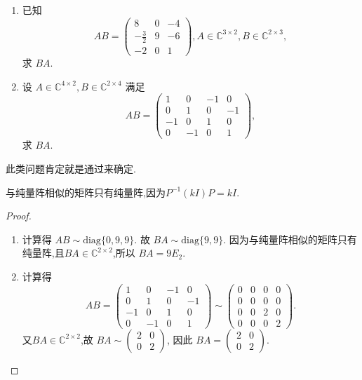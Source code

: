 \documentclass[../../main.tex]{subfiles}%
\begin{document}
\begin{example}
\begin{enumerate}
\item 已知
\[
AB = \begin{pmatrix}
8 & 0 & -4 \\
-\frac{3}{2} & 9 & -6 \\
-2 & 0 & 1
\end{pmatrix}, A \in \mathbb{C}^{3 \times 2}, B \in \mathbb{C}^{2 \times 3},
\]
求 \( BA \).

\item 设 \( A \in \mathbb{C}^{4 \times 2}, B \in \mathbb{C}^{2 \times 4} \) 满足
\[
AB = \begin{pmatrix}
1 & 0 & -1 & 0 \\
0 & 1 & 0 & -1 \\
-1 & 0 & 1 & 0 \\
0 & -1 & 0 & 1
\end{pmatrix},
\]
求 \( BA \).
\end{enumerate}
\end{example}
\begin{note}
此类问题肯定就是通过来确定.
\end{note}
\begin{remark}
与纯量阵相似的矩阵只有纯量阵,因为$P^{-1}(kI)P=kI$.
\end{remark}
\begin{proof}
\begin{enumerate}
\item 计算得 \( AB \sim \text{diag}\{0, 9, 9\} \). 故 \( BA \sim \text{diag}\{9, 9\} \). 因为与纯量阵相似的矩阵只有纯量阵,且$BA\in \mathbb{C}^{2\times 2}$,所以 \( BA = 9E_2 \).

\item 计算得
\[
AB = \begin{pmatrix}
1 & 0 & -1 & 0 \\
0 & 1 & 0 & -1 \\
-1 & 0 & 1 & 0 \\
0 & -1 & 0 & 1
\end{pmatrix} \sim \begin{pmatrix}
0 & 0 & 0 & 0 \\
0 & 0 & 0 & 0 \\
0 & 0 & 2 & 0 \\
0 & 0 & 0 & 2
\end{pmatrix}.
\]
又$BA\in \mathbb{C}^{2\times 2}$,故 \( BA \sim \begin{pmatrix} 2 & 0 \\ 0 & 2 \end{pmatrix} \), 因此 \( BA = \begin{pmatrix} 2 & 0 \\ 0 & 2 \end{pmatrix} \).
\end{enumerate}

\end{proof}
\end{document}
